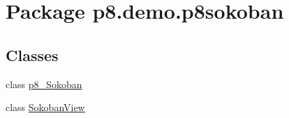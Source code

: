 \hypertarget{namespacep8_1_1demo_1_1p8sokoban}{}\section{Package p8.\+demo.\+p8sokoban}
\label{namespacep8_1_1demo_1_1p8sokoban}
\subsection*{Classes}
\begin{DoxyCompactItemize}
\item 
class \hyperlink{classp8_1_1demo_1_1p8sokoban_1_1p8___sokoban}{p8\+\_\+\+Sokoban}
\item 
class \hyperlink{classp8_1_1demo_1_1p8sokoban_1_1_sokoban_view}{Sokoban\+View}
\end{DoxyCompactItemize}
